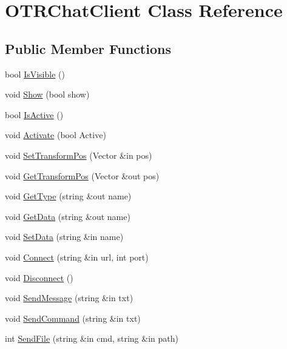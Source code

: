 \hypertarget{class_o_t_r_chat_client}{}\section{O\+T\+R\+Chat\+Client Class Reference}
\label{class_o_t_r_chat_client}
\subsection*{Public Member Functions}
\begin{DoxyCompactItemize}
\item 
bool \hyperlink{class_o_t_r_chat_client_ac59d53b04722e89834e262138e783cc0}{Is\+Visible} ()
\item 
void \hyperlink{class_o_t_r_chat_client_a03053ab6ffa2b27a311ddb646e7ffa7e}{Show} (bool show)
\item 
bool \hyperlink{class_o_t_r_chat_client_abcd18a99563d074369402c16f9843649}{Is\+Active} ()
\item 
void \hyperlink{class_o_t_r_chat_client_a7f56a3fefb06cb54ff8f25ad9b9ccd91}{Activate} (bool Active)
\item 
void \hyperlink{class_o_t_r_chat_client_ae4bc4b470f3881b7a6b52a109b2934ea}{Set\+Transform\+Pos} (Vector \&in pos)
\item 
void \hyperlink{class_o_t_r_chat_client_a5599bc1f3ae401972028ce68b9b74c2f}{Get\+Transform\+Pos} (Vector \&out pos)
\item 
void \hyperlink{class_o_t_r_chat_client_a215b98baed5f7b536a5c3133caca8768}{Get\+Type} (string \&out name)
\item 
void \hyperlink{class_o_t_r_chat_client_a801a5a877cb251882b094b9739a41049}{Get\+Data} (string \&out name)
\item 
void \hyperlink{class_o_t_r_chat_client_a329bd6c762a7359c5dd09a5315263044}{Set\+Data} (string \&in name)
\item 
void \hyperlink{class_o_t_r_chat_client_a8b5dc2d34f7d6e2dd9d821a1852d66ff}{Connect} (string \&in url, int port)
\item 
void \hyperlink{class_o_t_r_chat_client_aeeb6c37f983e53a4a007f67f920145e6}{Disconnect} ()
\item 
void \hyperlink{class_o_t_r_chat_client_aee69b7bfe4d463463d3cae040228728a}{Send\+Message} (string \&in txt)
\item 
void \hyperlink{class_o_t_r_chat_client_a01aaabbd16903730f77c0d975dc7bc98}{Send\+Command} (string \&in txt)
\item 
int \hyperlink{class_o_t_r_chat_client_afff6756f1aeb6947fa3359b9bde2501c}{Send\+File} (string \&in cmd, string \&in path)
\end{DoxyCompactItemize}


